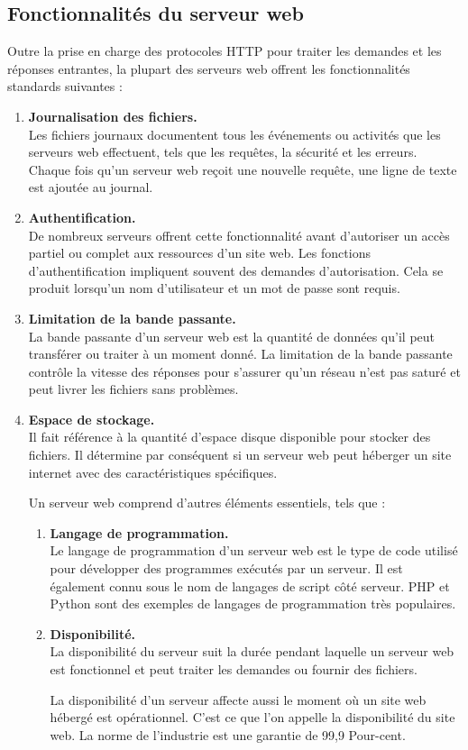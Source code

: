 \subsection{Fonctionnalités du serveur web}
Outre la prise en charge des protocoles HTTP pour traiter les demandes et les réponses entrantes, la plupart des serveurs web offrent les fonctionnalités standards suivantes :
\begin{enumerate}
	\item \textbf{ Journalisation des fichiers.\\} Les fichiers journaux documentent tous les événements ou activités que les serveurs web effectuent, tels que les requêtes, la sécurité et les erreurs. Chaque fois qu’un serveur web reçoit une nouvelle requête, une ligne de texte est ajoutée au journal.
	 
	 \item \textbf{ Authentification.\\} De nombreux serveurs offrent cette fonctionnalité avant d’autoriser un accès partiel ou complet aux ressources d’un site web. Les fonctions d’authentification impliquent souvent des demandes d’autorisation. Cela se produit lorsqu’un nom d’utilisateur et un mot de passe sont requis.
	 
	 \item \textbf{Limitation de la bande passante.\\} La bande passante d’un serveur web est la quantité de données qu’il peut transférer ou traiter à un moment donné. La limitation de la bande passante contrôle la vitesse des réponses pour s’assurer qu’un réseau n’est pas saturé et peut livrer les fichiers sans problèmes.
	 
	 \item \textbf{ Espace de stockage.\\} Il fait référence à la quantité d’espace disque disponible pour stocker des fichiers. Il détermine par conséquent si un serveur web peut héberger un site internet avec des caractéristiques spécifiques.
	 
	 Un serveur web comprend d’autres éléments essentiels, tels que :
	 \begin{enumerate}
	 	
	 
	 \item \textbf{Langage de programmation.\\} Le langage de programmation d’un serveur web est le type de code utilisé pour développer des programmes exécutés par un serveur. Il est également connu sous le nom de langages de script côté serveur. PHP et Python sont des exemples de langages de programmation très populaires.
	 
	 \item \textbf{Disponibilité.\\} La disponibilité du serveur suit la durée pendant laquelle un serveur web est fonctionnel et peut traiter les demandes ou fournir des fichiers. 
	 
	 \subitem La disponibilité d’un serveur affecte aussi le moment où un site web hébergé est opérationnel. C’est ce que l’on appelle la disponibilité du site web. La norme de l’industrie est une garantie de 99,9 Pour-cent.
	\end{enumerate}
\end{enumerate}
